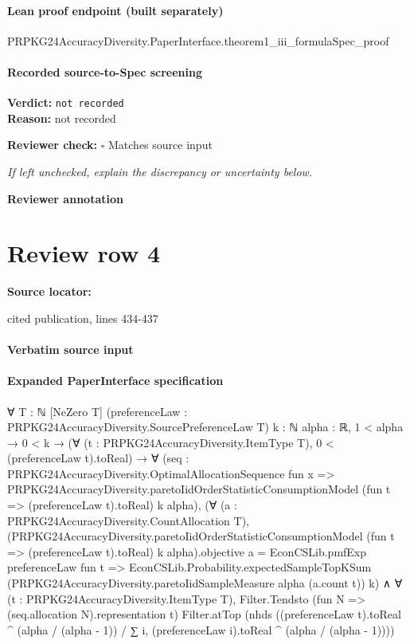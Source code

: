 \documentclass[10pt]{article}
\newcommand{\reviewerbox}{%
  \par\noindent\fbox{\parbox{0.96\linewidth}{\rule{0pt}{0.38in}}}\par
}
\newcommand{\reviewmatch}[1]{%
  \par\noindent\textbf{Reviewer check:} $\square$\; #1\par
  \noindent\emph{If left unchecked, explain the discrepancy or uncertainty below.}\par
}
\begin{document}
\paragraph{Lean proof endpoint (built separately)}\begin{ReviewVerbatim}
PRPKG24AccuracyDiversity.PaperInterface.theorem1_iii_formulaSpec_proof
\end{ReviewVerbatim}

\paragraph{Recorded source-to-Spec screening}
\textbf{Verdict:} \texttt{not recorded}
\\
\textbf{Reason:} not recorded
\reviewmatch{Matches source input}
\noindent\textbf{Reviewer annotation}\par
\reviewerbox
\clearpage
\hypertarget{source-claim-cc5ff6e8390a6049}{}
\section*{Review row 4}
\textbf{Source locator:} {\footnotesize\raggedright cited publication, lines 434-\allowbreak{}437\par}
\paragraph{Verbatim source input}
\begin{ReviewVerbatim}
\end{ReviewVerbatim}


\paragraph{Expanded PaperInterface specification}
\begin{ReviewVerbatim}
∀ {T : ℕ} [NeZero T] (preferenceLaw : PRPKG24AccuracyDiversity.SourcePreferenceLaw T) {k : ℕ} {alpha : ℝ},
  1 < alpha →
    0 < k →
      (∀ (t : PRPKG24AccuracyDiversity.ItemType T), 0 < (preferenceLaw t).toReal) →
        ∀
          (seq :
            PRPKG24AccuracyDiversity.OptimalAllocationSequence fun x =>
              PRPKG24AccuracyDiversity.paretoIidOrderStatisticConsumptionModel (fun t => (preferenceLaw t).toReal) k
                alpha),
          (∀ (a : PRPKG24AccuracyDiversity.CountAllocation T),
              (PRPKG24AccuracyDiversity.paretoIidOrderStatisticConsumptionModel (fun t => (preferenceLaw t).toReal) k
                      alpha).objective
                  a =
                EconCSLib.pmfExp preferenceLaw fun t =>
                  EconCSLib.Probability.expectedSampleTopKSum
                    (PRPKG24AccuracyDiversity.paretoIidSampleMeasure alpha (a.count t)) k) ∧
            ∀ (t : PRPKG24AccuracyDiversity.ItemType T),
              Filter.Tendsto (fun N => (seq.allocation N).representation t) Filter.atTop
                (nhds
                  ((preferenceLaw t).toReal ^ (alpha / (alpha - 1)) /
                    ∑ i, (preferenceLaw i).toReal ^ (alpha / (alpha - 1))))
\end{ReviewVerbatim}
\end{document}
